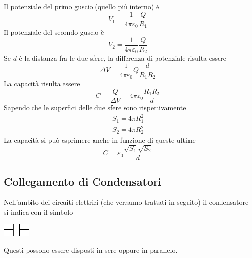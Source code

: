 \documentclass[10pt, letterpaper]{report}
\begin{document}
Il potenziale del primo guscio (quello più interno) è $$ V_1=\frac{1}{4\pi\varepsilon_0}\frac{Q}{R_1}$$
Il potenziale del secondo guscio è 
 $$ V_2=\frac{1}{4\pi\varepsilon_0}\frac{Q}{R_2}$$
 Se $d$ è la distanza fra le due sfere, la differenza di potenziale risulta essere 
 $$ \Delta V =\frac{1}{4\pi\varepsilon_0}Q\frac{d}{R_1R_2} $$
La capacità risulta essere 
$$ C=\frac{Q}{\Delta V}={4\pi\varepsilon_0}\frac{R_1R_2}{d}$$
Sapendo che le superfici delle due sfere sono rispettivamente $$\begin{matrix}
    S_1=4\pi R_1^2\\ 
    S_2=4\pi R_2^2
\end{matrix} $$
La capacità si può esprimere anche in funzione di queste ultime 
$$C=\varepsilon_0\frac{\sqrt{S_1}\sqrt{S_2}}{d} $$
\subsection{Collegamento di Condensatori}
Nell'ambito dei circuiti elettrici (che verranno trattati in seguito) il condensatore si indica con il simbolo \begin{center}
    \includegraphics[width=0.1\textwidth]{images/simboloCondensatore.eps}
\end{center} 
Questi possono essere disposti in sere oppure in parallelo.
\end{document}

